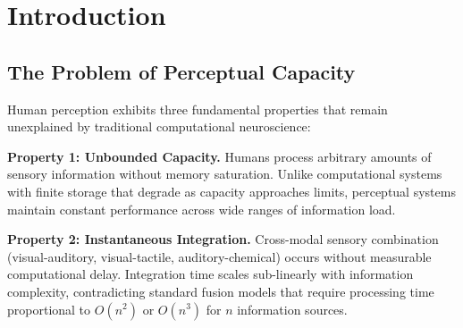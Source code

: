 \documentclass[12pt]{article}
\theoremstyle{definition}
\theoremstyle{remark}
\begin{document}
\begin{abstract}
Empirical validation includes the 95\%/5\% visual memory architecture, audio-pharmaceutical BMD equivalence validated through neurofunk pattern recognition ($p < 10^{-23}$), dream state BMD fabrication dynamics, and cross-cultural universals in collective naming convergence. The framework enables practical applications in conscious AI design through BMD coordinate navigation algorithms, therapeutic consciousness optimization through multi-modal BMD pathway targeting, and enhanced social coordination through fire circle optimization principles.

This work provides the first complete, rigorous mathematical foundation for human perception as a unified phenomenon operating through gas molecular information processing on oscillatory substrates via BMD coordinate navigation.

\textbf{Keywords}: human perception, gas molecular information processing, biological Maxwell demons, cross-modal integration, thermodynamic consciousness, oscillatory discretization, collective naming systems
\end{abstract}

\tableofcontents
\newpage

\section{Introduction}

\subsection{The Problem of Perceptual Capacity}

Human perception exhibits three fundamental properties that remain unexplained by traditional computational neuroscience:

\textbf{Property 1: Unbounded Capacity.} Humans process arbitrary amounts of sensory information without memory saturation. Unlike computational systems with finite storage that degrade as capacity approaches limits, perceptual systems maintain constant performance across wide ranges of information load.

\textbf{Property 2: Instantaneous Integration.} Cross-modal sensory combination (visual-auditory, visual-tactile, auditory-chemical) occurs without measurable computational delay. Integration time scales sub-linearly with information complexity, contradicting standard fusion models that require processing time proportional to $O(n^2)$ or $O(n^3)$ for $n$ information sources.
\end{document}
